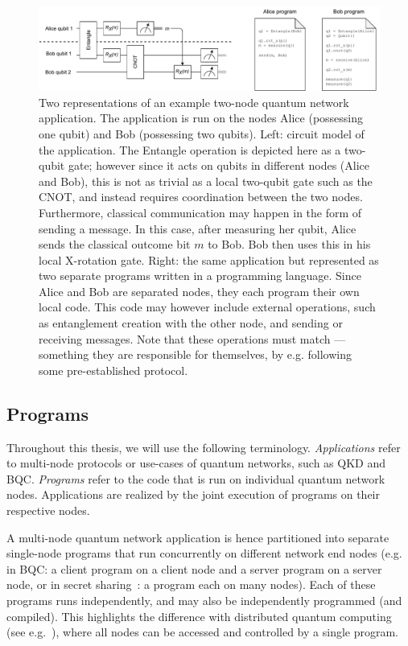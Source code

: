 \begin{figure}[t]
    \centering
    \includegraphics[width=1.0\textwidth]{figures/background/2node_circuit.pdf}
    \caption{
        Two representations of an example two-node quantum network application.
        The application is run on the nodes Alice (possessing one qubit) and Bob (possessing two qubits).
        Left: circuit model of the application.
        The Entangle operation is depicted here as a two-qubit gate; however since it acts on qubits in different nodes (Alice and Bob),
        this is not as trivial as a local two-qubit gate such as the CNOT, and instead requires coordination between the two nodes.
        Furthermore, classical communication may happen in the form of sending a message.
        In this case, after measuring her qubit, Alice sends the classical outcome bit $m$ to Bob.
        Bob then uses this in his local X-rotation gate.
        Right: the same application but represented as two separate programs written in a programming language.
        Since Alice and Bob are separated nodes, they each program their own local code.
        This code may however include external operations, such as entanglement creation with the other node, and sending or receiving messages.
        Note that these operations must match --- something they are responsible for themselves, by e.g. following some pre-established protocol.
    }
    \label{background:fig:2node_circuit}
\end{figure}


\subsection{Programs}
Throughout this thesis, we will use the following terminology.
\emph{Applications} refer to multi-node protocols or use-cases of quantum networks, such as QKD and BQC.
\emph{Programs} refer to the code that is run on individual quantum network nodes.
Applications are realized by the joint execution of programs on their respective nodes.

A multi-node quantum network application is hence partitioned into separate single-node programs that run concurrently on different network end nodes (e.g. in BQC: a client program on a client node and a server program on a server node, or in secret sharing~\cite{hillery1999quantum}: a program each on many nodes).
Each of these programs runs independently, and may also be independently programmed (and compiled).
This highlights the difference with distributed quantum computing (see e.g.~\cite{cacciapuoti2019quantum}), where all nodes can be accessed and controlled by a single program. 



